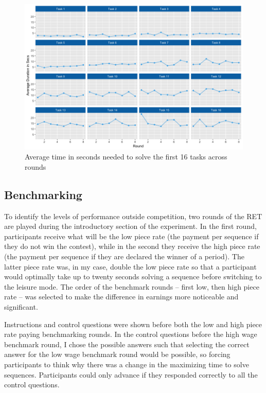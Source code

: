     \begin{figure}[h]
        \centering
        \includegraphics[width = \textwidth]{graphs/avg_time_per_task_round.png}
        \caption{Average time in seconds needed to solve the first 16 tasks across rounds}
        \label{fig:avg_time_task}
    \end{figure}
    
    
    \subsection{Benchmarking}
    \label{ss:benchmarking}
    
    To identify the levels of performance outside competition, two rounds of the RET are played during the introductory section of the experiment. In the first round, participants receive what will be the low piece rate (the payment per sequence if they do not win the contest), while in the second they receive the high piece rate (the payment per sequence if they are declared the winner of a period). The latter piece rate was, in my case, double the low piece rate so that a participant would optimally take up to twenty seconds solving a sequence before switching to the leisure mode. The order of the benchmark rounds -- first low, then high piece rate -- was selected to make the difference in earnings more noticeable and significant.
    
    Instructions and control questions were shown before both the low and high piece rate paying benchmarking rounds. In the control questions before the high wage benchmark round, I chose the possible answers such that selecting the correct answer for the low wage benchmark round would be possible, so forcing participants to think why there was a change in the maximizing time to solve sequences. Participants could only advance if they responded correctly to all the control questions.
    
